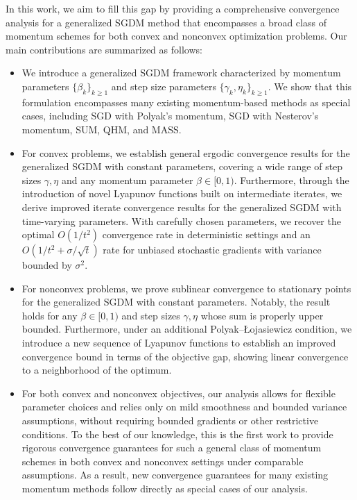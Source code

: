 \documentclass[10pt]{article}
\numberwithin{equation}{section}
\theoremstyle{definition}
\begin{document}
In this work, we aim to fill this gap by providing a comprehensive convergence analysis for a generalized SGDM method that encompasses a broad class of momentum schemes for both convex and nonconvex optimization problems. Our main contributions are summarized as follows:
\begin{itemize}
    \item[1).] We introduce a generalized SGDM framework characterized by momentum parameters $\{\beta_k\}_{k\ge 1}$ and step size parameters $\{\gamma_k,\eta_k\}_{k\ge 1}$. We show that this formulation encompasses many existing momentum-based methods as special cases, including SGD with Polyak’s momentum, SGD with Nesterov’s momentum, SUM, QHM, and MASS.
    
    \item[2).] For convex problems, we establish general ergodic convergence results for the generalized SGDM with constant parameters, covering a wide range of step sizes $\gamma,\eta$ and any momentum parameter $\beta\in[0,1)$. Furthermore, through the introduction of novel Lyapunov functions built on intermediate iterates, we derive improved iterate convergence results for the generalized SGDM with time-varying parameters. With carefully chosen parameters, we recover the optimal $O(1/t^2)$ convergence rate in deterministic settings and an $O(1/t^2+\sigma/\sqrt{t})$ rate for unbiased stochastic gradients with variance bounded by $\sigma^2$.

    \item[3).] For nonconvex problems, we prove sublinear convergence to stationary points for the generalized SGDM with constant parameters. Notably, the result holds for any $\beta\in[0,1)$ and step sizes $\gamma,\eta$ whose sum is properly upper bounded. Furthermore, under an additional Polyak--\L{}ojasiewicz condition, we introduce a new sequence of Lyapunov functions to establish an improved convergence bound in terms of the objective gap, showing linear convergence to a neighborhood of the optimum.

    \item[4).] For both convex and nonconvex objectives, our analysis allows for flexible parameter choices and relies only on mild smoothness and bounded variance assumptions, without requiring bounded gradients or other restrictive conditions. To the best of our knowledge, this is the first work to provide rigorous convergence guarantees for such a general class of momentum schemes in both convex and nonconvex settings under comparable assumptions. As a result, new convergence guarantees for many existing momentum methods follow directly as special cases of our analysis.
\end{itemize}
\end{document}
